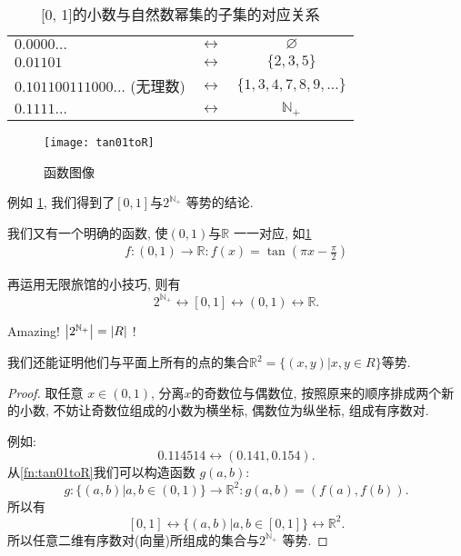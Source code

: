 \documentclass[UTF8]{mathrep}
\begin{document}
\begin{table}
  \begin{center}
    \begin{tabular}{lcc}
      \toprule
      $0. 0000\ldots $               & $\leftrightarrow$ &
      $\varnothing$                    \\
      $0. 01101$                     & $\leftrightarrow$ & $\{2, 3,
      5\}$                    \\
      $0. 101100111000\ldots $ (无理数) & $\leftrightarrow$ & $\{1, 3,
      4, 7, 8, 9,\ldots \}  $ \\
      $0. 1111\ldots $               & $\leftrightarrow$ &
      $\mathbb{N}_+$                   \\
      \bottomrule
    \end{tabular}
    \caption{[0, 1]的小数与自然数幂集的子集的对应关系}
    \label{tbl:01to2N}
  \end{center}
\end{table}

\begin{figure}
  \begin{center}
    \texttt{[image: tan01toR]}
    \caption{函数图像} \label{fig:tan}
  \end{center}
\end{figure}

例如 \cref{tbl:01to2N},
我们得到了$\left[0, 1\right]$与$2^{\mathbb{N}_+} $ 等势的结论.

我们又有一个明确的函数, 使$\left(0, 1\right)$与$\mathbb{R}$ 一一对应, 如\cref{fig:tan}
\begin{align}
  f \colon (0, 1) \to \mathbb{R} \colon f(x) = \tan (\pi x -
  \frac{\pi}{2}) \label{fn:tan01toR}
\end{align}

再运用无限旅馆的小技巧, 则有
\[
  2^{\mathbb{N}_+}\leftrightarrow [0, 1] \leftrightarrow (0, 1)
  \leftrightarrow \mathbb{R}
.\]

Amazing! $\left\lvert 2^{\mathbb{N}_+} \right\rvert = \left\lvert R \right\rvert$ !

我们还能证明他们与平面上所有的点的集合$\mathbb{R}^{2} = \{(x,y)| x, y \in R\} $等势.

\begin{proof}

  取任意 $x \in (0, 1)$, 分离$x$的奇数位与偶数位, 按照原来的顺序排成两个新的小数,
  不妨让奇数位组成的小数为横坐标, 偶数位为纵坐标, 组成有序数对.

  例如:
  \[
    0. 114514 \leftrightarrow (0. 141, 0. 154)
  .\]
  从\cref{fn:tan01toR}我们可以构造函数 $g(a,b)$:
  \[
    g \colon \{(a,b) | a, b \in (0, 1) \}  \to \mathbb{R}^{2}  \colon
    g(a,b) = (f(a), f(b))
  .\]
  所以有
  \[
    [0, 1] \leftrightarrow \{(a,b)| a,b \in [0, 1]\} \leftrightarrow
    \mathbb{R}^{2}
  .\]
  所以任意二维有序数对(向量)所组成的集合与$2^{\mathbb{N}_+} $ 等势.
\end{proof}
\end{document}
